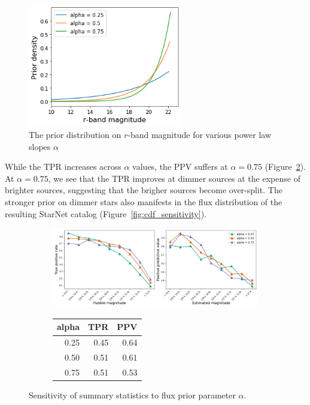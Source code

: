 \begin{figure}[!h]
    \centering
    \includegraphics[width = 0.6\textwidth]{figures/prior_fluxes.png}
    \caption{The prior distribution on $r$-band magnitude for various power law slopes $\alpha$}
    \label{fig:flux_priors}
\end{figure}

While the TPR increases across $\alpha$ values, the PPV suffers at $\alpha = 0.75$ (Figure~\ref{fig:alpha_sensitivity}).
At $\alpha = 0.75$, we see that the TPR improves at dimmer sources at the expense of brighter sources, suggesting that the brigher sources become over-split. 
The stronger prior on dimmer stars also manifests in the flux distribution of the resulting StarNet catalog (Figure~\ref{fig:cdf_sensitivity}). 

\begin{figure}[ht]
\begin{subfigure}{\textwidth}
\centering
\includegraphics[width = \textwidth]{figures/prior_alpha_sensitivty.png}
\end{subfigure}
\begin{subfigure}{\textwidth}
\begin{center}
\begin{tabular}{rrr}
\toprule
 alpha &   TPR &   PPV \\
\midrule
  0.25 &  0.45 &  0.64 \\
  0.50 &  0.51 &  0.61 \\
  0.75 &  0.51 &  0.53 \\
\bottomrule
\end{tabular}
\par\vspace{0pt}
\end{center}
\end{subfigure}\hfill
\caption{Sensitivity of summary statistics to flux prior parameter $\alpha$. }
\label{fig:alpha_sensitivity}
\end{figure}

